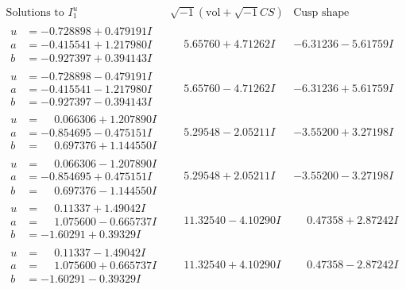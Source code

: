 \documentclass[1p]{elsarticle_modified}
\theoremstyle{definition}
\newcommand{\I}{\sqrt{-1}}
\begin{document}
$$\begin{array}{c|c|c}  
\text{Solutions to }I^u_{1}& \I (\text{vol} + \sqrt{-1}CS) & \text{Cusp shape}\\
 \hline 
\begin{aligned}
u &= -0.728898 + 0.479191 I \\
a &= -0.415541 + 1.217980 I \\
b &= -0.927397 + 0.394143 I\end{aligned}
 & \phantom{-}5.65760 + 4.71262 I & -6.31236 - 5.61759 I \\ \hline\begin{aligned}
u &= -0.728898 - 0.479191 I \\
a &= -0.415541 - 1.217980 I \\
b &= -0.927397 - 0.394143 I\end{aligned}
 & \phantom{-}5.65760 - 4.71262 I & -6.31236 + 5.61759 I \\ \hline\begin{aligned}
u &= \phantom{-}0.066306 + 1.207890 I \\
a &= -0.854695 - 0.475151 I \\
b &= \phantom{-}0.697376 + 1.144550 I\end{aligned}
 & \phantom{-}5.29548 - 2.05211 I & -3.55200 + 3.27198 I \\ \hline\begin{aligned}
u &= \phantom{-}0.066306 - 1.207890 I \\
a &= -0.854695 + 0.475151 I \\
b &= \phantom{-}0.697376 - 1.144550 I\end{aligned}
 & \phantom{-}5.29548 + 2.05211 I & -3.55200 - 3.27198 I \\ \hline\begin{aligned}
u &= \phantom{-}0.11337 + 1.49042 I \\
a &= \phantom{-}1.075600 - 0.665737 I \\
b &= -1.60291 + 0.39329 I\end{aligned}
 & \phantom{-}11.32540 - 4.10290 I & \phantom{-}0.47358 + 2.87242 I \\ \hline\begin{aligned}
u &= \phantom{-}0.11337 - 1.49042 I \\
a &= \phantom{-}1.075600 + 0.665737 I \\
b &= -1.60291 - 0.39329 I\end{aligned}
 & \phantom{-}11.32540 + 4.10290 I & \phantom{-}0.47358 - 2.87242 I \\ \hline\begin{aligned}

\end{aligned}
\end{array}$$
\end{document}
